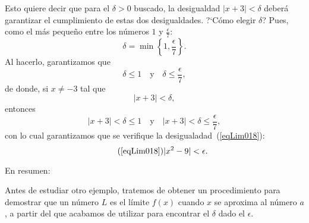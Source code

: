 \begin{exemplo}[Solución]
Esto quiere decir que para el $\delta > 0$ buscado, la desigualdad $|x + 3| < \delta$ deberá
garantizar el cumplimiento de estas dos desigualdades. ?`Cómo elegir $\delta$? Pues, como el más
pequeño entre los números $1$ y $\frac{\epsilon}{7}$:
\[
\delta = \min\left\{1,\frac{\epsilon}{7}\right\}.
\]
Al hacerlo, garantizamos que
\[
\delta \leq 1\quad\text{y}\quad \delta \leq \frac{\epsilon}{7},
\]
de donde, si $x\neq -3$ tal que
\[
|x + 3| < \delta,
\]
entonces
\[
|x + 3| < \delta \leq 1 \quad\text{y}\quad |x + 3| < \delta \leq \frac{\epsilon}{7},
\]
con lo cual garantizamos que se verifique la desigualadad~(\ref{eqLim018}):
\[
\tag{\ref{eqLim018}}
|x^2 - 9| < \epsilon.
\]

En resumen:
\vspace*{-1.4\baselineskip}
\end{exemplo}

Antes de estudiar otro ejemplo, tratemos de obtener un procedimiento para demostrar que un número
$L$ es el límite $f(x)$ cuando $x$ se aproxima al número $a$, a partir del que acabamos de utilizar
para encontrar el $\delta$ dado el $\epsilon$.

